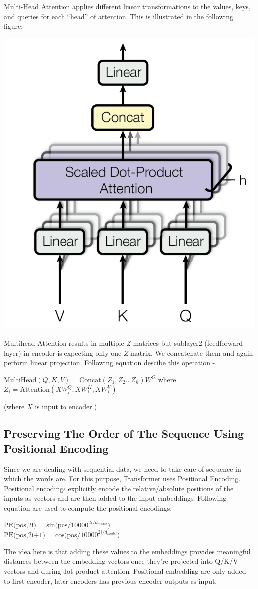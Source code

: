 \documentclass{article}
\begin{document}
\begin{multicols}{2}
Multi-Head Attention applies different linear transformations to the values, keys, and queries for each “head” of attention. This is illustrated in the following figure:
\begin{center}
        \captionsetup{type=figure}
        \includegraphics[width=.40\textwidth]{MultiHead.png}
\end{center}

Multihead Attention results in multiple $Z$ matrices but sublayer2 (feedforward layer) in encoder is expecting only one $Z$ matrix. We concatenate them and again perform linear projection. Following equation descibe this operation -
\begin{center}
$\text{MultiHead}(Q, K, V ) = \text{Concat} (Z_1, Z_2 \dots Z_h)W^O$
where $Z_i = \text{Attention} (XW^Q_i,XW^K_i, XW^V_i)$
\end{center}
(where $X$ is input to encoder.)

\subsection{Preserving The Order of The Sequence Using Positional Encoding}
Since we are dealing with sequential data, we need to take care of sequence in which the words are. For this purpose, Transformer uses Positional Encoding. Positional encodings explicitly encode the relative/absolute positions of the inputs as vectors and are then added to the input embeddings.
Following equation are used to compute the positional encodings:
\begin{center}
$\text{PE(pos,2i) = sin(pos/10000}^{2i/d_{model}})$\\
$\text{PE(pos,2i+1) = cos(pos/10000}^{2i/d_{model}})$
\end{center}
\noindent The idea here is that adding these values to the embeddings provides meaningful distances between the embedding vectors once they’re projected into Q/K/V vectors and during dot-product attention.
Positional embedding are only added to first encoder, later encoders has previous encoder outputs as input.


\end{multicols}
\end{document}
